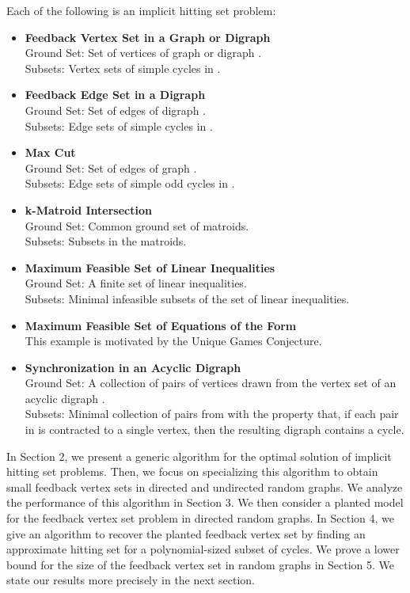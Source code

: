 \documentclass[11pt]{article}
\begin{document}
\noindent Each of the following is an implicit hitting set problem:
\begin{itemize}
\item {\bf Feedback Vertex Set in a Graph or Digraph}\\
Ground Set: Set of vertices of graph or digraph .\\
Subsets: Vertex sets of simple cycles in .


\item {\bf Feedback Edge Set in a Digraph}\\
Ground Set: Set of edges of digraph .\\
Subsets: Edge sets of simple cycles in .


\item {\bf Max Cut}\\
Ground Set: Set of edges of graph .\\
Subsets: Edge sets of simple odd cycles in .


\item {\bf k-Matroid Intersection}\\
Ground Set: Common ground set of  matroids.\\
Subsets: Subsets in the  matroids.

\item {\bf Maximum Feasible Set of Linear Inequalities}\\
Ground Set: A finite set of linear inequalities.\\
Subsets: Minimal infeasible subsets of the set of linear inequalities.


\item {\bf Maximum Feasible Set of Equations of the Form }\\
This example is motivated by the Unique Games Conjecture.

\item {\bf Synchronization in an Acyclic Digraph}\\
Ground Set: A collection  of pairs of vertices drawn from the vertex set of
an acyclic digraph .\\
Subsets: Minimal collection  of pairs from  with the property that, if
each pair in  is contracted to a single vertex, then the resulting digraph
contains a cycle.
\end{itemize}



 In Section 2, we present a generic algorithm for the optimal solution of implicit hitting set problems. Then, we focus on specializing this algorithm to obtain small feedback vertex sets in directed and undirected random graphs. We analyze the performance of this algorithm in Section 3. We then consider a planted model for the feedback vertex set problem in directed random graphs. In Section 4, we give an algorithm to recover the planted feedback vertex set by finding an approximate hitting set for a polynomial-sized subset of cycles. We prove a lower bound for the size of the feedback vertex set in random graphs in Section 5. We state our results more precisely in the next section.
\end{document}
